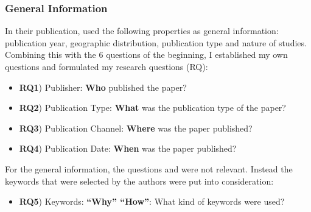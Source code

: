 \subsubsection{General Information}
\label{subsubsec:general_information}
In their publication, \citet{2018_Li} used the following properties as general information: publication year, geographic distribution, publication type and nature of studies. Combining this with the 6 questions of the beginning, I established my own questions and formulated my research questions (RQ):
\begin{itemize}[noitemsep]
	\item \textbf{RQ1}) Publisher: \textbf{Who} published the paper?
	\item \textbf{RQ2}) Publication Type: \textbf{What} was the publication type of the paper?
	\item \textbf{RQ3}) Publication Channel: \textbf{Where} was the paper published?
	\item \textbf{RQ4}) Publication Date: \textbf{When} was the paper published?
\end{itemize}
For the general information, the questions  and  were not relevant. Instead the keywords that were selected by the authors were put into consideration:
\begin{itemize}
	\item \textbf{RQ5}) Keywords: \textbf{\enquote{Why} \enquote{How}}: What kind of keywords were used?
\end{itemize}


